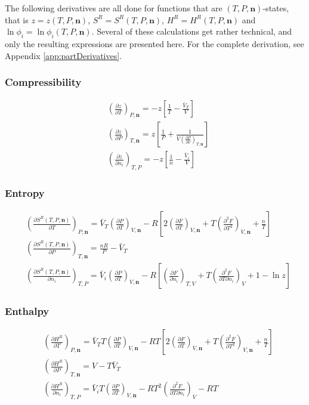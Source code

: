 \documentclass[internal,english]{sintefmemo2012}
\numberwithin{equation}{section}
\newcommand*{\pder}[2]{\left(\frac{\partial #1}{\partial #2}\right)}
\newcommand*{\pdder}[2]{\left(\frac{\partial^2 #1}{\partial #2^2}\right)}
\newcommand*{\pdcross}[3]{\left(\frac{\partial^2 #1}{\partial #2 \partial #3}\right)}
\begin{document}
The following derivatives are all done for functions that are $(T,P,\textbf{n})$-states, that is $z = z(T,P,\textbf{n})$, $S^R = S^R(T,P,\textbf{n})$, $H^R = H^R(T,P,\textbf{n})$ and $\ln \phi_i = \ln \phi_i(T,P,\textbf{n})$. Several of these calculations get rather technical, and only the resulting expressions are presented here. For the complete derivation, see Appendix \ref{app:partDerivatives}.
\subsubsection*{Compressibility}
\begin{align}
\label{eq:z_T}
& \left( \frac{\partial z}{\partial T} \right)_{P, \textbf{n}} = -z\left[\frac{1}{T} - \frac{\bar{V}_T}{V}\right] \\
\label{eq:z_P}
& \left( \frac{\partial z}{\partial P} \right)_{T, \textbf{n}} = z \left[ \frac{1}{P} + \frac{1}{V \pder{P}{V}_{T,\textbf{n}}} \right] \\
\label{eq:z_i}
& \left( \frac{\partial z}{\partial n_i} \right)_{T,P} = - z \left[ \frac{1}{n} - \frac{\bar{V}_i}{V}  \right]
\end{align}

\subsubsection*{Entropy}
\begin{align}
\label{eq:S^R_T}
& \pder{S^R(T,P,\textbf{n})}{T}_{P,\textbf{n}} = \bar{V}_T \pder{P}{T}_{V,\textbf{n}} - R \left[2\pder{F}{T}_{V,\textbf{n}} + T \pdder{F}{T}_{V,\textbf{n}} + \frac{n}{T} \right] \\
\label{eq:S^R_P}
& \pder{S^R(T,P,\textbf{n})}{P}_{T,\textbf{n}} = \frac{nR}{P} - \bar{V}_T \\
\label{eq:S^R_i}
& \pder{S^R(T,P,\textbf{n})}{n_i}_{T,P} = \bar{V}_i \pder{P}{T}_{V,\textbf{n}} - R\left[ \pder{F}{n_i}_{T,V} + T\pdcross{F}{T}{n_i}_V + 1 - \ln z \right] 
\end{align}

\subsubsection*{Enthalpy}
\begin{align}
\label{eq:H^R_T}
& \pder{H^R}{T}_{P, \textbf{n}} = \bar{V}_T T \pder{P}{T}_{V,\textbf{n}} - RT \left[ 2\pder{F}{T}_{V,\textbf{n}} + T \pdder{F}{T}_{V,\textbf{n}} + \frac{n}{T} \right] \\
\label{eq:H^R_P}
& \pder{H^R}{P}_{T, \textbf{n}} = V - T \bar{V}_T \\
\label{eq:H^R_i}
& \pder{H^R}{n_i}_{T,P}  = \bar{V}_i T \pder{P}{T}_{V,\textbf{n}} -RT^2 \pdcross{F}{T}{n_i}_V - RT
\end{align}
\end{document}
